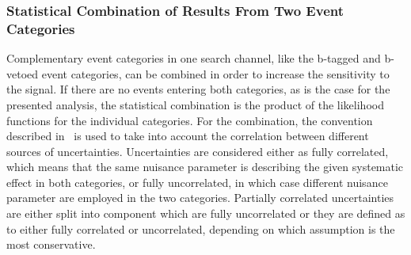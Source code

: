 \subsubsection{Statistical Combination of Results From Two Event Categories}
Complementary event categories in one search channel, 
like the b-tagged and b-vetoed event categories, 
can be combined in order to increase the
sensitivity to the signal. If there are no events entering both categories, as is the case for  the presented analysis,
the statistical combination is the product of the likelihood
functions for the individual categories. For the combination, the  convention described in~\cite{lhclimits} is used
to take into account the correlation between different sources of uncertainties.
Uncertainties are considered either as fully correlated, which means that the same nuisance parameter
is describing the given systematic effect in both categories,  or fully uncorrelated, in which case different nuisance parameter are
employed in the two categories. Partially correlated uncertainties are either split into component which are fully
 uncorrelated or they are defined as  to either fully correlated or uncorrelated, depending on which assumption is the most conservative.



